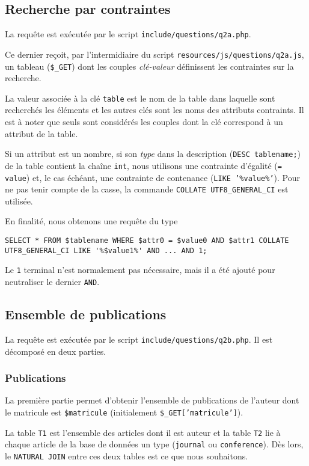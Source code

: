 \documentclass[a4paper, 12pt]{article}
\begin{document}
    \subsection{Recherche par contraintes}
    La requête est exécutée par le script \texttt{include/questions/q2a.php}.
    
    Ce dernier reçoit, par l'intermidiaire du script \texttt{resources/js/questions/q2a.js}, un tableau (\texttt{\$\_GET}) dont les couples \emph{clé-valeur} définissent les contraintes sur la recherche. \par
    La valeur associée à la clé \texttt{table} est le nom de la table dans laquelle sont recherchés les éléments et les autres clés sont les noms des attributs contraints. Il est à noter que seuls sont considérés les couples dont la clé correspond à un attribut de la table. \par
    Si un attribut est un nombre, \cad{} si son \emph{type} dans la description (\texttt{DESC tablename;}) de la table contient la chaîne \texttt{int}, nous utilisons une contrainte d'égalité (\texttt{= value}) et, le cas échéant, une contrainte de contenance (\texttt{LIKE '\%value\%'}). Pour ne pas tenir compte de la casse, la commande \texttt{COLLATE UTF8\_GENERAL\_CI} est utilisée. \par
    En finalité, nous obtenons une requête du type 
    \begin{lstlisting}[style=sql, gobble=8]
        SELECT * FROM $tablename WHERE $attr0 = $value0 AND $attr1 COLLATE UTF8_GENERAL_CI LIKE '%$value1%' AND ... AND 1;
    \end{lstlisting}
    Le \texttt{1} terminal n'est normalement pas nécessaire, mais il a été ajouté pour neutraliser le dernier \texttt{AND}.
    \subsection{Ensemble de publications}
    La requête est exécutée par le script \texttt{include/questions/q2b.php}. Il est décomposé en deux parties.
    \subsubsection{Publications}
    La première partie permet d'obtenir l'ensemble de publications de l'auteur dont le matricule est \texttt{\$matricule} (initialement \texttt{\$\_GET['matricule']}).
    
    La table \texttt{T1} est l'ensemble des articles dont il est auteur et la table \texttt{T2} lie à chaque article de la base de données un type (\texttt{journal} ou \texttt{conference}). Dès lors, le \texttt{NATURAL JOIN} entre ces deux tables est ce que nous souhaitons.
\end{document}
